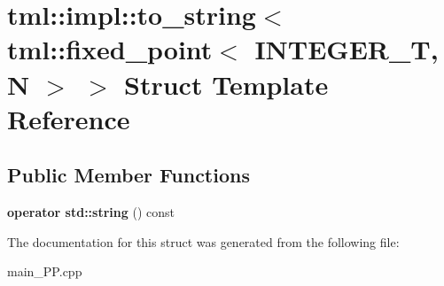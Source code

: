 \hypertarget{structtml_1_1impl_1_1to__string_3_01tml_1_1fixed__point_3_01INTEGER__T_00_01N_01_4_01_4}{\section{tml\+:\+:impl\+:\+:to\+\_\+string$<$ tml\+:\+:fixed\+\_\+point$<$ I\+N\+T\+E\+G\+E\+R\+\_\+\+T, N $>$ $>$ Struct Template Reference}
\label{structtml_1_1impl_1_1to__string_3_01tml_1_1fixed__point_3_01INTEGER__T_00_01N_01_4_01_4}
}
\subsection*{Public Member Functions}
\begin{DoxyCompactItemize}
\item 
\hypertarget{structtml_1_1impl_1_1to__string_3_01tml_1_1fixed__point_3_01INTEGER__T_00_01N_01_4_01_4_a693b016bd558b0cc6ff854cf82633ac9}{{\bfseries operator std\+::string} () const }\label{structtml_1_1impl_1_1to__string_3_01tml_1_1fixed__point_3_01INTEGER__T_00_01N_01_4_01_4_a693b016bd558b0cc6ff854cf82633ac9}

\end{DoxyCompactItemize}


The documentation for this struct was generated from the following file\+:\begin{DoxyCompactItemize}
\item 
main\+\_\+\+P\+P.\+cpp\end{DoxyCompactItemize}

